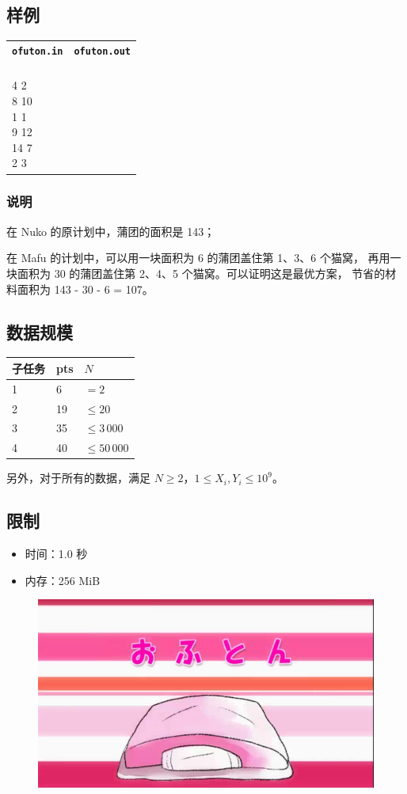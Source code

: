 \documentclass[UTF8, 11pt, a4paper]{article}
\begin{document}
\subsection*{样例}
\begin{table}[h]\centering
\begin{tabularx}{0.8 \textwidth}{|X|X|}
\hline
\texttt{\textbf{ofuton.in}} & \texttt{\textbf{ofuton.out}} \\ \hline
{\ttfamily
6\newline
4 2\newline
8 10\newline
1 1\newline
9 12\newline
14 7\newline
2 3
} & {\ttfamily
107
}
\\ \hline
\end{tabularx}\end{table}
\subsubsection*{说明}
在 Nuko 的原计划中，蒲团的面积是 143；

在 Mafu 的计划中，可以用一块面积为 6 的蒲团盖住第 1、3、6 个猫窝，%
再用一块面积为 30 的蒲团盖住第 2、4、5 个猫窝。可以证明这是最优方案，%
节省的材料面积为 143 - 30 - 6 = 107。

\subsection*{数据规模}
\begin{table}[h]\centering
\begin{tabularx}{0.5 \textwidth}{X|X|X}
子任务 & pts & $N$            \\ \hline\hline
1      & 6   & $= 2$          \\ \hline
2      & 19  & $\leq 20$      \\ \hline
3      & 35  & $\leq 3\,000$  \\ \hline
4      & 40  & $\leq 50\,000$ \\
\end{tabularx}\end{table}
另外，对于所有的数据，满足 $N \geq 2$，$1 \leq X_i, Y_i \leq 10^9$。

\subsection*{限制}
\begin{itemize}
\item 时间：1.0 秒
\item 内存：256 MiB
\end{itemize}

\begin{figure}[h]\centering
\includegraphics[width=0.6 \textwidth]{ofuton.png}
\end{figure}
\end{document}
